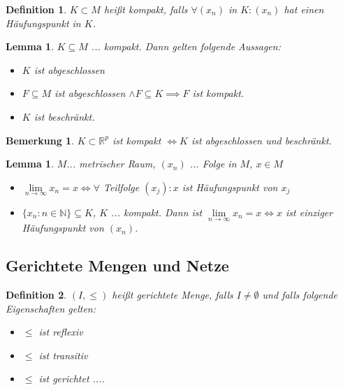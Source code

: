 \documentclass[twocolumn]{article}
\newtheorem{lemma}[theorem]{Lemma}
\newtheorem{definition}{Definition}[section]
\newtheorem*{remark}{Bemerkung}
\newcommand*{\logeq}{\Leftrightarrow}
\begin{document}
\begin{definition}
	$K \subset M$ heißt kompakt, falls $\forall (x_n)$ in $K : (x_n)$ hat einen Häufungspunkt in $K$.
\end{definition}

\begin{lemma}
	$K \subseteq M$ ... kompakt. Dann gelten folgende Aussagen:
	\begin{itemize}
		\item $K$ ist abgeschlossen
		\item $F \subseteq M$ ist abgeschlossen $\land F \subseteq K \implies F$ ist kompakt.
		\item $K$ ist beschränkt.
	\end{itemize}
\end{lemma}

\begin{remark}
	$K \subset \mathbb{R}^p$ ist kompakt $\logeq K$ ist abgeschlossen und beschränkt.
\end{remark}

\begin{lemma}
	$M$... metrischer Raum, $(x_n)$ ... Folge in $M$, $x \in M$
	\begin{itemize}
		\item $\lim\limits_{n \rightarrow\infty}x_n = x \logeq \forall$ Teilfolge $(x_j) : x$ ist Häufungspunkt von $x_j$
		\item $\{x_n : n \in \mathbb{N}\}\subseteq K$, $K$ ... kompakt. Dann ist $\lim\limits_{n \rightarrow\infty}x_n=x \logeq x$ ist einziger Häufungspunkt von $(x_n)$.
	\end{itemize}
\end{lemma}

\subsection{Gerichtete Mengen und Netze}
\begin{definition}
	$(I, \leq)$ heißt gerichtete Menge, falls $I \neq \emptyset$ und falls folgende Eigenschaften gelten:
	\begin{itemize}
		\item $\leq$ ist reflexiv
		\item $\leq$ ist transitiv
		\item $\leq$ ist gerichtet ....
	\end{itemize}
\end{definition}
\end{document}
